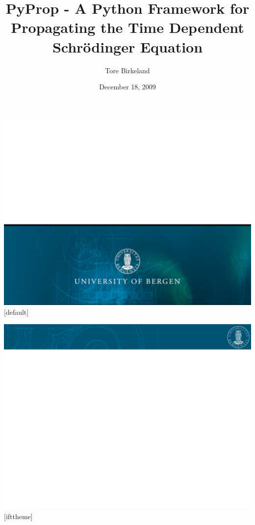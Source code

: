 \documentclass{beamer}
\title{PyProp - A Python Framework for Propagating the Time Dependent Schrödinger Equation}
\author{Tore Birkeland}
\institute{
Department of Mathematics, University of Bergen
}
\date{December 18, 2009}
\begin{document}
 {\includegraphics[width=\paperwidth,height=\paperheight]{frontpage_bg}}
[default]

\begin{frame}
  \titlepage
  \vspace{5cm}
\end{frame}

%
%
 {\includegraphics[width=\paperwidth,height=\paperheight]{slide_bg}}
[ifttheme]

\end{document}
